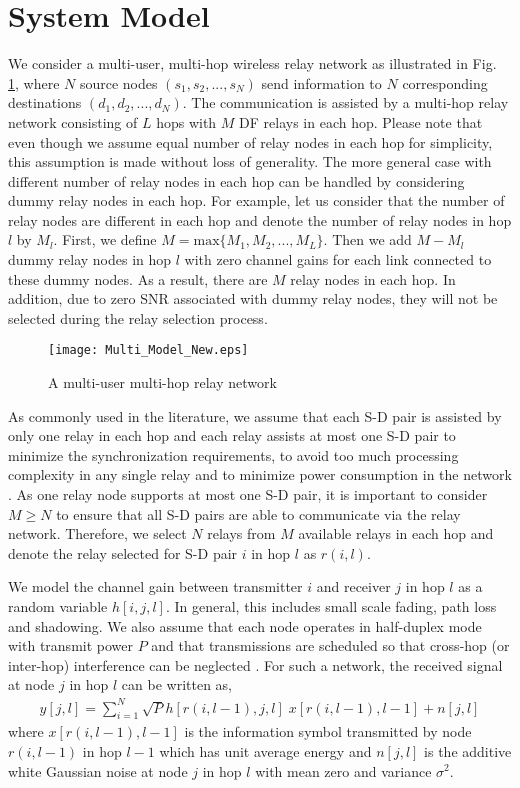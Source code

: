 \documentclass[12pt,draftclsnofoot,onecolumn]{IEEEtran}
\begin{document}
	\section{System Model}\label{Sec-model}
	We consider a multi-user, multi-hop wireless relay network as illustrated in Fig. \ref{figure1}, where $N$ source nodes $(s_1,s_2,...,s_N)$ send information to $N$ corresponding destinations $(d_1, d_2,..., d_N)$. The communication is assisted by a multi-hop relay network consisting of $L$ hops with $M$ DF relays in each hop. Please note that even though we assume equal number of relay nodes in each hop for simplicity, this assumption is made without loss of generality. The more general case with different number of relay nodes in each hop can be handled by considering dummy relay nodes in each hop. For example, let us consider that the number of relay nodes are different in each hop and denote the number of relay nodes in hop $l$ by $M_l$. First, we define $M=\textrm{max} \{M_1,M_2,...,M_L\}$. Then we add $M-M_l$ dummy relay nodes in hop $l$ with zero channel gains for each link connected to these dummy nodes. As a result, there are $M$ relay nodes in each hop. In addition, due to zero SNR associated with dummy relay nodes, they will not be selected during the relay selection process.
	\begin{figure}
		\centering
		\texttt{[image: Multi\_Model\_New.eps]}
		\centering\caption{A multi-user multi-hop relay network}
		\label{figure1}
	\end{figure}
	As commonly used in the literature, we assume that each S-D pair is assisted by only one relay in each hop and each relay assists at most one S-D pair to minimize the synchronization requirements, to avoid too much processing complexity in any single relay and to minimize power consumption in the network \cite{2809748,130815}. As one relay node supports at most one S-D pair, it is important to consider $M\ge N$ to ensure that all S-D pairs are able to communicate via the relay network. Therefore, we select $N$ relays from $M$ available relays in each hop and denote the relay selected for S-D pair $i$ in hop $l$ as $r(i,l)$.
	
	We model the channel gain between transmitter $i$ and receiver $j$ in hop $l$ as a random variable $h[i,j,l]$. In general, this includes small scale fading, path loss and shadowing. We also assume that each node operates in half-duplex mode with transmit power $P$ and that transmissions are scheduled so that cross-hop (or inter-hop) interference can be neglected \cite{2809748,6364160}. For such a network, the received signal at node $j$ in hop $l$ can be written as,
	\begin{align}
	y[j,l] = \sum_{i=1}^{N}\sqrt{P}h[r(i,l-1),j,l]\; x[r(i,l-1),l-1] + n[j,l]
	\end{align}
	where $x[r(i,l-1),l-1]$ is the information symbol transmitted by node $r(i,l-1)$ in hop $l-1$ which has unit average energy and $n[j,l]$ is the additive white Gaussian noise at node $j$ in hop $l$ with mean zero and variance $\sigma^2$. 
	
\end{document}
